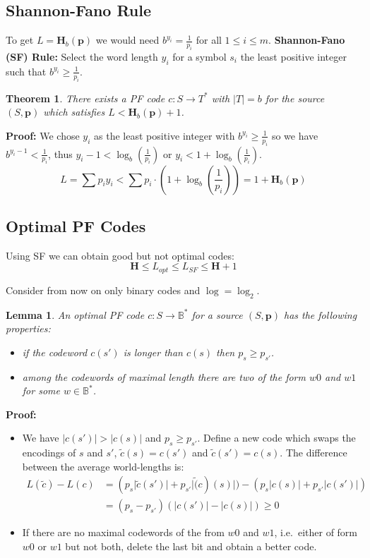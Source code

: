 \documentclass[11pt]{article}
\newtheorem{theo}{Theorem}
\newtheorem{lem}{Lemma}
\begin{document}
\subsection{Shannon-Fano Rule}
To get $L = \textbf{H}_b(\textbf{p})$ we would need $b^{y_i} = \frac{1}{p_i}$ for all $1 \leq i \leq m$.
\textbf{Shannon-Fano (SF) Rule:}
Select the word length $y_i$ for a symbol $s_i$ the least positive integer such that $b^{y_i} \geq \frac{1}{p_i}$.
\begin{theo}
  There exists a PF code $c : S \rightarrow T^*$ with $\lvert T \rvert = b$ for the source $(S, \textbf{p})$ which satisfies $L < \textbf{H}_b(\textbf{p}) + 1$.
\end{theo}

\textbf{Proof:}
We chose $y_i$ as the least positive integer with $b^{y_i} \geq \frac{1}{p_i}$ so we have $b^{y_i - 1} < \frac{1}{p_i}$, thus $y_i - 1 < \log_b(\frac{1}{p_i})$ or $y_i < 1 + \log_b(\frac{1}{p_i})$.
\[
  L = \sum p_iy_i < \sum p_i \cdot (1 + \log_b(\frac{1}{p_i})) = 1 + \textbf{H}_b(\textbf{p})
\]

\subsection{Optimal PF Codes}
Using SF we can obtain good but not optimal codes:
\[
  \textbf{H} \leq L_{opt} \leq L_{SF} \leq \textbf{H} + 1
\]

Consider from now on only binary codes and $\log = \log_2$.

\begin{lem}
  An optimal PF code $c : S \rightarrow \mathbb{B}^*$ for a source $(S, \textbf{p})$ has the following properties:
  \begin{itemize}
    \item if the codeword $c(s')$ is longer than $c(s)$ then $p_s \geq p_{s'}$.
    \item among the codewords of maximal length there are two of the form $w0$ and $w1$ for some $w \in \mathbb{B}^*$.
  \end{itemize}
\end{lem}

\textbf{Proof:}
\begin{itemize}
  \item We have $\lvert c(s') \rvert > \lvert c(s) \rvert$ and $p_s \geq p_{s'}$.
    Define a new code which swaps the encodings of $s$ and $s'$, $\tilde{c}(s) = c(s')$ and $\tilde{c}(s') = c(s)$.
    The difference between the average world-lengths is:
    \begin{align*}
      L(\tilde{c}) - L(c) &= (p_s \lvert \tilde{c}(s') \rvert + p_{s'} \lvert \tilde(c)(s) \rvert) - (p_s \lvert c(s) \rvert + p_{s'} \lvert c(s') \rvert) \\
      &= (p_s - p_{s'})(\lvert c(s') \rvert - \lvert c(s) \rvert) \geq 0
    \end{align*}
  \item If there are no maximal codewords of the from $w0$ and $w1$, i.e.\ either of form $w0$ or $w1$ but not both, delete the last bit and obtain a better code.
\end{itemize}
\end{document}
